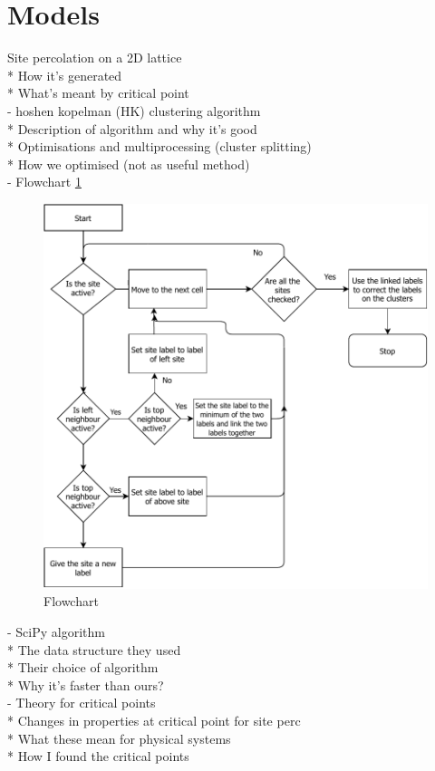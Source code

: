 \documentclass[%
 reprint,
 amsmath,amssymb,
 aps,
]{revtex4-2}
\begin{document}
\section{Models}
Site percolation on a 2D lattice\\
* How it's generated\\
* What's meant by critical point\\
- hoshen kopelman (HK) clustering algorithm \cite{hoshen_percolation_1976}\\
* Description of algorithm and why it's good\\
* Optimisations and multiprocessing (cluster splitting)\\
* How we optimised (not as useful method)\\
- Flowchart \cref{fig:hk_flow}\\
\begin{figure}
    \centering
    \includegraphics[width=\linewidth]{assets/hk_algroithm}
    \caption{Flowchart}
    \label{fig:hk_flow}
\end{figure}
- SciPy algorithm\\
* The data structure they used\\
* Their choice of algorithm\\
* Why it's faster than ours?\\
- Theory for critical points\\
* Changes in properties at critical point for site perc\\
* What these mean for physical systems\\
* How I found the critical points\\
\end{document}
